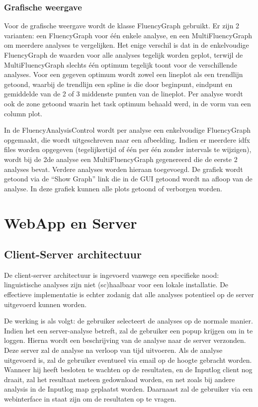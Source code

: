 \documentclass[a4paper,11pt]{report}
\begin{document}
\subsection{Grafische weergave}
Voor de grafische weergave wordt de klasse FluencyGraph gebruikt. Er zijn 2 varianten: een FluencyGraph voor \'e\'en enkele analyse, en een MultiFluencyGraph om meerdere analyses te vergelijken. Het enige verschil is dat in de enkelvoudige FluencyGraph de waarden voor alle analyses tegelijk worden geplot, terwijl de MultiFluencyGraph slechts \'e\'en optimum tegelijk toont voor de verschillende analyses. Voor een gegeven optimum wordt zowel een lineplot als een trendlijn getoond, waarbij de trendlijn een spline is die door beginpunt, eindpunt en gemiddelde van de 2 of 3 middenste punten van de lineplot. Per analyse wordt ook de zone getoond waarin het task optimum behaald werd, in de vorm van een column plot.

In de FluencyAnalysisControl wordt per analyse een enkelvoudige FluencyGraph opgemaakt, die wordt uitgeschreven naar een afbeelding. Indien er meerdere idfx files worden opgegeven (tegelijkertijd of \'e\'en per \'e\'en zonder intervals te wijzigen), wordt bij de 2de analyse een MultiFluencyGraph gegenereerd die de eerste 2 analyses bevat. Verdere analyses worden hieraan toegevoegd. De grafiek wordt getoond via de ``Show Graph'' link die in de GUI getoond wordt na afloop van de analyse. In deze grafiek kunnen alle plots getoond of verborgen worden.

\chapter{WebApp en Server}
\section{Client-Server architectuur}
De client-server architectuur is ingevoerd vanwege een specifieke nood: linguistische analyses zijn niet (sc)haalbaar voor een lokale installatie.
De effectieve implementatie is echter zodanig dat alle analyses potentieel op de server uitgevoerd kunnen worden.

De werking is als volgt: de gebruiker selecteert de analyses op de normale manier. Indien het een server-analyse betreft, zal de gebruiker een popup krijgen om in te loggen. Hierna wordt een beschrijving van de analyse naar de server verzonden. Deze server zal de analyse na verloop van tijd uitvoeren. Als de analyse uitgevoerd is, zal de gebruiker eventueel via email op de hoogte gebracht worden. Wanneer hij heeft besloten te wachten op de resultaten, en de Inputlog client nog draait, zal het resultaat meteen gedownload worden, en net zoals bij andere analysis in de Inputlog map geplaatst worden. Daarnaast zal de gebruiker via een webinterface in staat zijn om de resultaten op te vragen.
\end{document}
